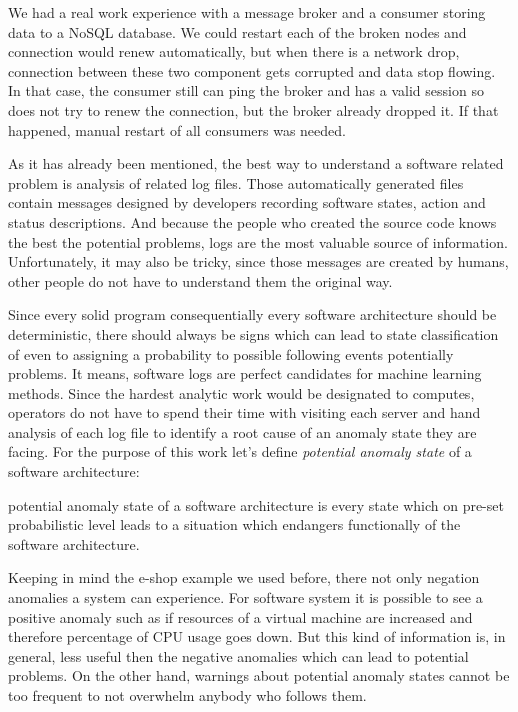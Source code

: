We had a real work experience with a message broker and a consumer storing data to a NoSQL database. We could restart each of the broken nodes and connection would renew automatically, but when there is a network drop, connection between these two component gets corrupted and data stop flowing. In that case, the consumer still can ping the broker and has a valid session so does not try to renew the connection, but the broker already dropped it. If that happened, manual restart of all consumers was needed. 

As it has already been mentioned, the best way to understand a software related problem is analysis of related log files. Those automatically generated files contain messages designed by developers recording software states, action and status descriptions. And because the people who created the source code knows the best the potential problems, logs are the most valuable source of information. Unfortunately, it may also be tricky, since those messages are created by humans, other people do not have to understand them the original way.

Since every solid program consequentially every software architecture should be deterministic, there should always be signs which can lead to state classification of even to assigning a probability to possible following events potentially problems. It means, software logs are perfect candidates for machine learning methods. Since the hardest analytic work would be designated to computes, operators do not have to spend their time with visiting each server and hand analysis of each log file to identify a root cause of an anomaly state they are facing.
For the purpose of this work let's define \textit{potential anomaly state} of a software architecture:

\begin{definition}\label{def:potentilAnomalyState} potential anomaly state of a software architecture is every state which on pre-set probabilistic level leads to a situation which endangers functionally of the software architecture.
\end{definition}

Keeping in mind the e-shop example we used before, there not only negation anomalies a system can experience. For software system it is possible to see a positive anomaly such as if resources of a virtual machine are increased and therefore percentage of CPU usage goes down. But this kind of information is, in general, less useful then the negative anomalies which can lead to potential problems. On the other hand, warnings about potential anomaly states cannot be too frequent to not overwhelm anybody who follows them.

